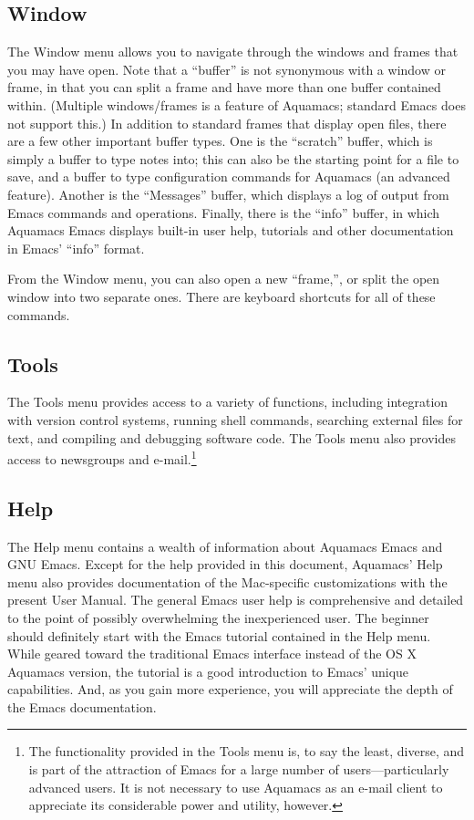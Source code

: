 \documentclass[11pt,letterpaper]{article}
\begin{document}
\subsection{Window}
The Window menu allows you to navigate through the windows and frames that you may have open. Note that a ``buffer'' is not synonymous with a window or frame, in that you can split a frame and have more than one buffer contained within. (Multiple windows/frames is a feature of Aquamacs; standard Emacs does not support this.) In addition to standard frames that display open files, there are a few other important buffer types. One is the ``scratch'' buffer, which is simply a buffer to type notes into; this can also be the starting point for a file to save, and a buffer to type configuration commands for Aquamacs (an advanced feature). Another is the ``Messages'' buffer, which displays a log of output from Emacs commands and operations. Finally, there is the ``info'' buffer, in which Aquamacs Emacs displays built-in user help, tutorials and other documentation in Emacs' ``info'' format.
 
From the Window menu, you can also open a new ``frame,'', or split the open window into two separate ones.  There are keyboard shortcuts for all of these commands.


\subsection{Tools}
The Tools menu provides access to a variety of functions, including integration with version control systems, running shell commands, searching external files for text, and compiling and debugging software code. The Tools menu also provides access to newsgroups and e-mail.\footnote{The functionality provided in the Tools menu is, to say the least, diverse, and is part of the attraction of Emacs for a large number of users---particularly advanced users. It is not necessary to use Aquamacs as an e-mail client to appreciate its considerable power and utility, however.}

\subsection{Help}
The Help menu contains a wealth of information about Aquamacs Emacs and GNU Emacs. Except for the help provided in this document, Aquamacs' Help menu also provides documentation of the Mac-specific customizations with the present User Manual. The general Emacs user help is comprehensive and detailed to the point of possibly overwhelming the inexperienced user. The beginner should definitely start with the Emacs tutorial contained in the Help menu. While geared toward the traditional Emacs interface instead of the OS X Aquamacs version, the tutorial is a good introduction to Emacs' unique capabilities. And, as you gain more experience, you will appreciate the depth of the Emacs documentation.
\end{document}
